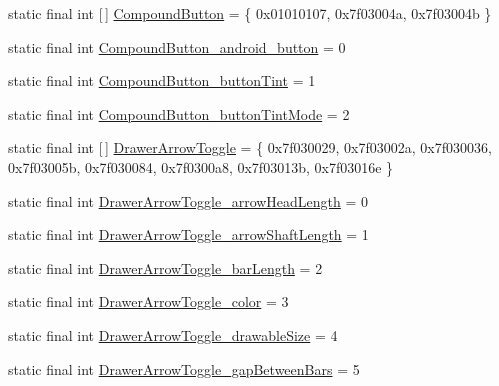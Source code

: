 \begin{DoxyCompactItemize}
static final int \mbox{[}$\,$\mbox{]} \mbox{\hyperlink{classandroid_1_1support_1_1v7_1_1appcompat_1_1R_1_1styleable_aa66e991e0d5dc9db5a9048c91817235f}{Compound\+Button}} = \{ 0x01010107, 0x7f03004a, 0x7f03004b \}
\item 
static final int \mbox{\hyperlink{classandroid_1_1support_1_1v7_1_1appcompat_1_1R_1_1styleable_a63a32142a434a35b617a20d37de7309b}{Compound\+Button\+\_\+android\+\_\+button}} = 0
\item 
static final int \mbox{\hyperlink{classandroid_1_1support_1_1v7_1_1appcompat_1_1R_1_1styleable_ad218170e42fc2d34a654daa377be5365}{Compound\+Button\+\_\+button\+Tint}} = 1
\item 
static final int \mbox{\hyperlink{classandroid_1_1support_1_1v7_1_1appcompat_1_1R_1_1styleable_a67ad529a176565bd35892e51d52b2594}{Compound\+Button\+\_\+button\+Tint\+Mode}} = 2
\item 
static final int \mbox{[}$\,$\mbox{]} \mbox{\hyperlink{classandroid_1_1support_1_1v7_1_1appcompat_1_1R_1_1styleable_a7bd3ecc07eb763b454c40c0871959a35}{Drawer\+Arrow\+Toggle}} = \{ 0x7f030029, 0x7f03002a, 0x7f030036, 0x7f03005b, 0x7f030084, 0x7f0300a8, 0x7f03013b, 0x7f03016e \}
\item 
static final int \mbox{\hyperlink{classandroid_1_1support_1_1v7_1_1appcompat_1_1R_1_1styleable_a72cc7e3ed61db5e3d7706bf08e50835a}{Drawer\+Arrow\+Toggle\+\_\+arrow\+Head\+Length}} = 0
\item 
static final int \mbox{\hyperlink{classandroid_1_1support_1_1v7_1_1appcompat_1_1R_1_1styleable_af4c2d441d3064d37a2503f20ae40dd2a}{Drawer\+Arrow\+Toggle\+\_\+arrow\+Shaft\+Length}} = 1
\item 
static final int \mbox{\hyperlink{classandroid_1_1support_1_1v7_1_1appcompat_1_1R_1_1styleable_a9803c7705602c81b9a1da96464e0f66a}{Drawer\+Arrow\+Toggle\+\_\+bar\+Length}} = 2
\item 
static final int \mbox{\hyperlink{classandroid_1_1support_1_1v7_1_1appcompat_1_1R_1_1styleable_a778acebe5d0d81bc358d6395592f2f4e}{Drawer\+Arrow\+Toggle\+\_\+color}} = 3
\item 
static final int \mbox{\hyperlink{classandroid_1_1support_1_1v7_1_1appcompat_1_1R_1_1styleable_ab4e5d8c4feff81f48c37f877d680e866}{Drawer\+Arrow\+Toggle\+\_\+drawable\+Size}} = 4
\item 
static final int \mbox{\hyperlink{classandroid_1_1support_1_1v7_1_1appcompat_1_1R_1_1styleable_a6e43ac7ba6e98e7802537044437c6806}{Drawer\+Arrow\+Toggle\+\_\+gap\+Between\+Bars}} = 5
\item 

\end{DoxyCompactItemize}
